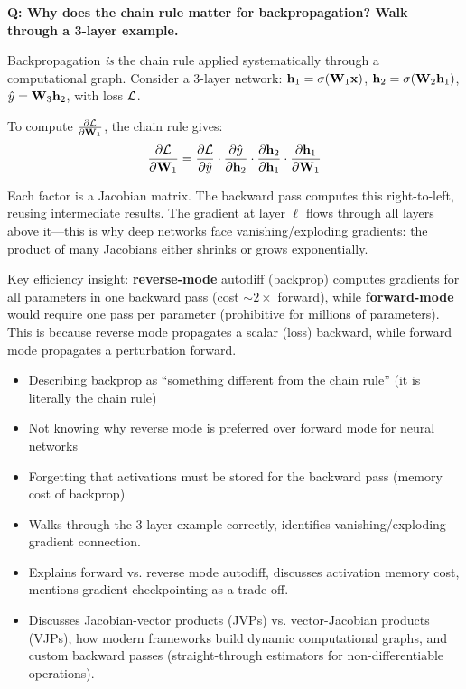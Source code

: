 \begin{interviewq}
\textbf{Q: Why does the chain rule matter for backpropagation? Walk through a 3-layer example.}

 \quad {} \quad \badgefreq{\freqhigh}

\stronganswer
Backpropagation \textit{is} the chain rule applied systematically through a computational graph. Consider a 3-layer network: $\mathbf{h}_1 = \sigma(\mathbf{W}_1 \mathbf{x})$, $\mathbf{h}_2 = \sigma(\mathbf{W}_2 \mathbf{h}_1)$, $\hat{y} = \mathbf{W}_3 \mathbf{h}_2$, with loss $\mathcal{L}$.

To compute $\frac{\partial \mathcal{L}}{\partial \mathbf{W}_1}$, the chain rule gives:
$$\frac{\partial \mathcal{L}}{\partial \mathbf{W}_1} = \frac{\partial \mathcal{L}}{\partial \hat{y}} \cdot \frac{\partial \hat{y}}{\partial \mathbf{h}_2} \cdot \frac{\partial \mathbf{h}_2}{\partial \mathbf{h}_1} \cdot \frac{\partial \mathbf{h}_1}{\partial \mathbf{W}_1}$$

Each factor is a Jacobian matrix. The backward pass computes this right-to-left, reusing intermediate results. The gradient at layer $\ell$ flows through all layers above it---this is why deep networks face vanishing/exploding gradients: the product of many Jacobians either shrinks or grows exponentially.

Key efficiency insight: \textbf{reverse-mode} autodiff (backprop) computes gradients for all parameters in one backward pass (cost $\sim 2\times$ forward), while \textbf{forward-mode} would require one pass per parameter (prohibitive for millions of parameters). This is because reverse mode propagates a scalar (loss) backward, while forward mode propagates a perturbation forward.

\redflags
\begin{itemize}
    \item Describing backprop as ``something different from the chain rule'' (it is literally the chain rule)
    \item Not knowing why reverse mode is preferred over forward mode for neural networks
    \item Forgetting that activations must be stored for the backward pass (memory cost of backprop)
\end{itemize}


\goodgreat
\begin{itemize}
    \item {} Walks through the 3-layer example correctly, identifies vanishing/exploding gradient connection.
    \item {} Explains forward vs. reverse mode autodiff, discusses activation memory cost, mentions gradient checkpointing as a trade-off.
    \item {} Discusses Jacobian-vector products (JVPs) vs. vector-Jacobian products (VJPs), how modern frameworks build dynamic computational graphs, and custom backward passes (straight-through estimators for non-differentiable operations).
\end{itemize}


\end{interviewq}
